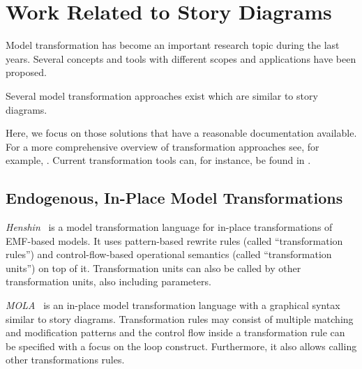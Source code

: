 
\section{Work Related to Story Diagrams}
\label{sec:RW_RelatedWork}

Model transformation has become an important research topic during the last years.
Several concepts and tools with different scopes and applications have been proposed.

Several model transformation approaches exist which are similar to story diagrams.

Here, we focus on those solutions that have a reasonable documentation available.
For a more comprehensive overview of transformation approaches see, for example, \cite{Czarnecki06}.
Current transformation tools can, for instance, be found in \cite{TTC2010}.

\subsection{Endogenous, In-Place Model Transformations}

\emph{Henshin}~\cite{henshin2} is a model transformation language for in-place transformations of EMF-based models.
It uses pattern-based rewrite rules (called ``transformation rules'') and control-flow-based operational semantics (called ``transformation units'') on top of it.
Transformation units can also be called by other transformation units, also including parameters.

\emph{MOLA}~\cite{mola} is an in-place model transformation language with a graphical syntax similar to story diagrams.
Transformation rules may consist of multiple matching and modification patterns and the control flow inside a transformation rule can be specified with a focus on the loop construct.
Furthermore, it also allows calling other transformations rules. %

